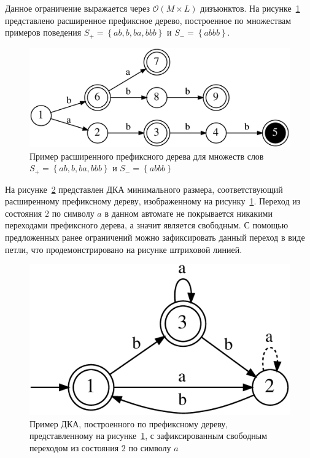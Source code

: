 Данное ограничение выражается через $\mathcal{O}\left(M\times L\right)$ дизъюнктов.
На рисунке~\ref{img:apta-loop} представлено расширенное префиксное дерево, построенное по множествам примеров поведения $S_{+}=\left\{ab,b,ba,bbb\right\}$ и $S_{-}=\left\{abbb\right\}$.
%
\begin{figure}[ht]
  \centering
  \includegraphics[scale=0.15]{img/datamod/FIG9a.eps}
  \caption{Пример расширенного префиксного дерева для множеств слов $S_{+}=\left\{ab,b,ba,bbb\right\}$ и $S_{-}=\left\{abbb\right\}$}
  \label{img:apta-loop}
\end{figure}
%
На рисунке~\ref{img:dfa-loop} представлен ДКА минимального размера, соответствующий расширенному префиксному дереву, изображенному на рисунку~\ref{img:apta-loop}.
Переход из состояния $2$ по символу $a$ в данном автомате не покрывается никакими переходами префиксного дерева, а значит является свободным.
С помощью предложенных ранее ограничений можно зафиксировать данный переход в виде петли, что продемонстрировано на рисунке штриховой линией.
%
\begin{figure}[ht]
  \centering
  \includegraphics[scale=0.15]{img/datamod/FIG9b.eps}
  \caption{Пример ДКА, построенного по префиксному дереву, представленному на рисунке~\ref{img:apta-loop}, с зафиксированным свободным переходом из состояния $2$ по символу $a$}
  \label{img:dfa-loop}
\end{figure}

